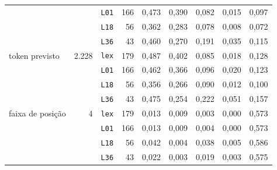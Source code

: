 \begin{tabular}{lrlrrrrrr}
 &  & \texttt{L01} & 166 & 0,473 & 0,390 & 0,082 & 0,015 & 0,097 \\
 &  & \texttt{L18} & 56 & 0,362 & 0,283 & 0,078 & 0,008 & 0,072 \\
 &  & \texttt{L36} & 43 & 0,460 & 0,270 & 0,191 & 0,035 & 0,115 \\
\midrule
token previsto & 2.228 & \texttt{lex} & 179 & 0,487 & 0,402 & 0,085 & 0,018 & 0,128 \\
 &  & \texttt{L01} & 166 & 0,462 & 0,366 & 0,096 & 0,020 & 0,123 \\
 &  & \texttt{L18} & 56 & 0,356 & 0,266 & 0,090 & 0,012 & 0,100 \\
 &  & \texttt{L36} & 43 & 0,475 & 0,254 & 0,222 & 0,051 & 0,157 \\
\midrule
faixa de posição & 4 & \texttt{lex} & 179 & 0,013 & 0,009 & 0,003 & 0,000 & 0,573 \\
 &  & \texttt{L01} & 166 & 0,013 & 0,009 & 0,004 & 0,000 & 0,573 \\
 &  & \texttt{L18} & 56 & 0,042 & 0,004 & 0,038 & 0,005 & 0,586 \\
 &  & \texttt{L36} & 43 & 0,022 & 0,003 & 0,019 & 0,003 & 0,575 \\
\bottomrule
\end{tabular}

\par{}
